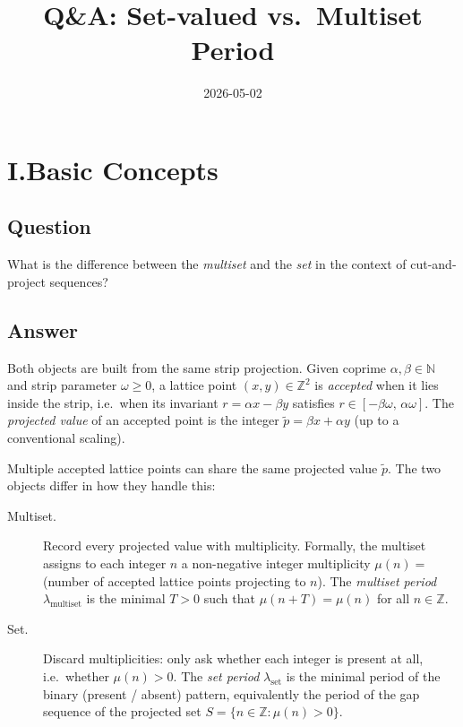 \documentclass{amsart}
\title{Q\&A: Set-valued vs.\ Multiset Period}
\date{2026-05-02}
\theoremstyle{definition}
\theoremstyle{plain}
\theoremstyle{remark}
\begin{document}
\maketitle

\section*{I.\enspace Basic Concepts}

\subsection*{Question}

What is the difference between the \emph{multiset} and the \emph{set} in the
context of cut-and-project sequences?

\subsection*{Answer}

Both objects are built from the same strip projection.  Given coprime
\(\alpha,\beta\in\mathbb{N}\) and strip parameter \(\omega\ge 0\), a lattice
point \((x,y)\in\mathbb{Z}^2\) is \emph{accepted} when it lies inside the
strip, i.e.\ when its invariant \(r = \alpha x - \beta y\) satisfies
\(r\in[-\beta\omega,\,\alpha\omega]\).  The \emph{projected value} of an
accepted point is the integer \(\tilde p = \beta x + \alpha y\) (up to a
conventional scaling).

Multiple accepted lattice points can share the same projected value \(\tilde
p\).  The two objects differ in how they handle this:

\begin{description}
  \item[Multiset.]
    Record every projected value with multiplicity.  Formally, the multiset
    assigns to each integer \(n\) a non-negative integer multiplicity
    \(\mu(n) =\) (number of accepted lattice points projecting to \(n\)).
    The \emph{multiset period} \(\lambda_{\mathrm{multiset}}\) is the minimal
    \(T>0\) such that \(\mu(n+T)=\mu(n)\) for all \(n\in\mathbb{Z}\).

  \item[Set.]
    Discard multiplicities: only ask whether each integer is present at all,
    i.e.\ whether \(\mu(n)>0\).  The \emph{set period}
    \(\lambda_{\mathrm{set}}\) is the minimal period of the binary (present /
    absent) pattern, equivalently the period of the gap sequence of the
    projected set \(S = \{n\in\mathbb{Z}: \mu(n)>0\}\).
\end{description}
\end{document}
